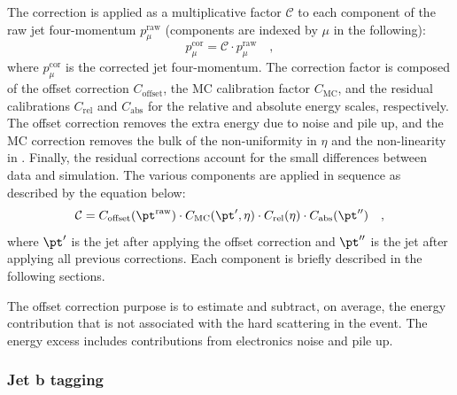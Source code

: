 The correction is applied as a multiplicative factor $\mathcal{C}$ to each component of the raw jet four-momentum $p_\mu^\mathrm{raw}$ (components are indexed by $\mu$ in the following):
\begin{equation}
p_\mu^\mathrm{cor} = \mathcal{C}\cdot p_\mu^\mathrm{raw} \quad,
\end{equation}
where $p_\mu^\mathrm{cor}$ is the corrected jet four-momentum. The correction factor is composed of the offset correction $C_\mathrm{offset}$, the MC calibration factor $C_\mathrm{MC}$, and the residual calibrations $C_\mathrm{rel}$ and $C_\mathrm{abs}$ for the relative and absolute energy scales, respectively. The offset correction removes the extra energy due to noise and pile up, and the MC correction removes the bulk of the non-uniformity in $\eta$ and the non-linearity in \pt. Finally, the residual corrections account for the small differences between data and simulation.  The various components are applied in sequence as described by the equation below:
\begin{equation}
\mathcal{C} = C_\mathrm{offset}(\pt^\mathrm{raw}) \cdot C_\mathrm{MC}(\pt',\eta) \cdot C_\mathrm{rel}(\eta) \cdot C_\mathrm{abs}(\pt'') \quad ,
\end{equation}
where $\pt'$ is the jet \pt after applying the offset correction and $\pt''$ is the jet \pt after applying all previous corrections. Each component is briefly described in the following sections.

 
The offset correction purpose is to estimate and subtract, on average, the energy contribution that is not associated with the hard scattering in the event. The energy excess includes contributions from electronics noise and pile up.

\subsubsection{Jet b tagging}










	
